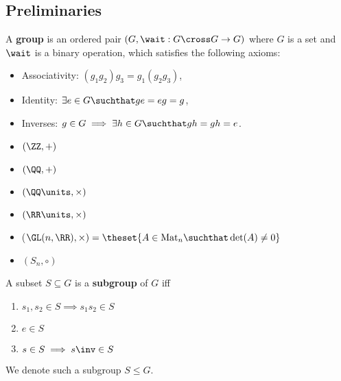 \hypertarget{preliminaries}{%
\subsection{Preliminaries}\label{preliminaries}}


A \textbf{group} is an ordered pair \((G, \wait: G\cross G \to G)\)
where \(G\) is a set and \(\wait\) is a binary operation, which
satisfies the following axioms:

\begin{itemize}
\tightlist
\item
  Associativity: \((g_1 g_2)g_3 = g_1(g_2 g_3)\),
\item
  Identity: \(\exists e\in G \suchthat ge = eg = g\),
\item
  Inverses: \(g\in G \implies \exists h\in G \suchthat gh = gh = e\).
\end{itemize}


\hfill

\begin{itemize}
\tightlist
\item
  \((\ZZ, +)\)
\item
  \((\QQ, +)\)
\item
  \((\QQ\units, \times)\)
\item
  \((\RR\units, \times)\)
\item
  (\(\GL(n, \RR), \times) = \theset{A \in \mathrm{Mat}_n \suchthat \det(A) \neq 0}\)
\item
  \((S_n, \circ)\)
\end{itemize}



A subset \(S \subseteq G\) is a \textbf{subgroup} of \(G\) iff

\begin{enumerate}
\def\labelenumi{\arabic{enumi}.}
\tightlist
\item
  \(s_1, s_2 \in S \implies s_1 s_2 \in S\)
\item
  \(e\in S\)
\item
  \(s\in S \implies s\inv \in S\)
\end{enumerate}


We denote such a subgroup \(S \leq G\).

